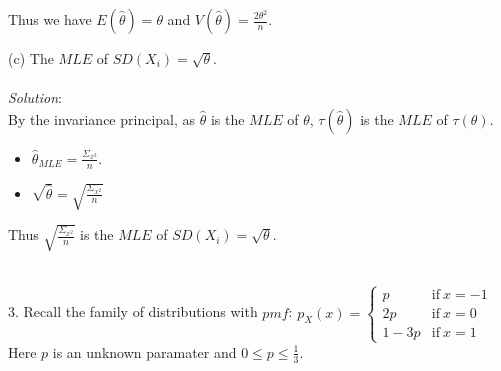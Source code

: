 \documentclass[12pt]{article}
\newcommand{\XB}{\color{black}}
\newcommand{\XBB}{\color{blue}}
\newcommand{\ds}{\displaystyle}
\begin{document}
\noindent
Thus we have $ \ds E(\hat{\theta}) = \theta $ and $ \ds V(\hat{\theta}) = \frac{2\theta^{2}}{n} $. \\

\vspace{2.5mm} 

(c) The $ MLE $ of $ SD(X_{i}) = \sqrt{\theta} $. \\
\vspace{2.5mm} \\
\textit{Solution}:
\vspace{2.5mm} \\

\noindent
By the invariance principal, as $ \hat{\theta} $ is the $ MLE $ of $ \theta $, $ \tau(\hat{\theta}) $ is the $ MLE $ of $ \tau(\theta) $. \\

\begin{itemize}
    \item $ \ds \hat{\theta}_{MLE} = \frac{\Sigma_{x^{2}}}{n} $.
    \item $ \ds \sqrt{\hat{\theta}} = \sqrt{\frac{\Sigma_{x^{2}}}{n}} $
\end{itemize}

\noindent
Thus $ \ds \sqrt{\frac{\Sigma_{x^{2}}}{n}} $ is the $ MLE $ of $ SD(X_{i}) = \sqrt{\theta} $. \\

\vspace{2.5mm} 

\newpage
\XBB\hrulefill\XB \\

3. Recall the family of distributions with $ \displaystyle pmf $: $p_{X}(x) = 
\begin{cases} 
    p & \text{if} \  x = -1 \\
    2p &  \text{if} \ x = 0 \\
    1 - 3p & \text{if} \ x = 1
\end{cases} $ \\ 

Here $ p $ is an unknown paramater and $ \displaystyle 0 \leq p \leq \frac{1}{3} $. \\
\end{document}
